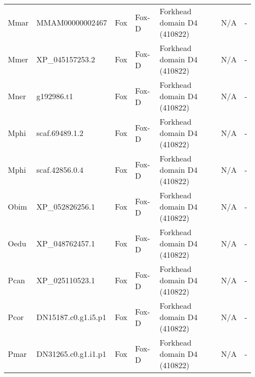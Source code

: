 \documentclass[../main.tex]{subfiles}
\begin{document}
\begin{landscape}
\begin{longtable}{lllllll}
		Mmar           & MMAM00000002467       & Fox            & Fox-D               & Forkhead domain D4 (410822)                 & N/A                                                                    & -                    \\
		Mmer           & XP\_045157253.2       & Fox            & Fox-D               & Forkhead domain D4 (410822)                 & N/A                                                                    & -                    \\
		Mner           & g192986.t1            & Fox            & Fox-D               & Forkhead domain D4 (410822)                 & N/A                                                                    & -                    \\
		Mphi           & scaf.69489.1.2        & Fox            & Fox-D               & Forkhead domain D4 (410822)                 & N/A                                                                    & -                    \\
		Mphi           & scaf.42856.0.4        & Fox            & Fox-D               & Forkhead domain D4 (410822)                 & N/A                                                                    & -                    \\
		Obim           & XP\_052826256.1       & Fox            & Fox-D               & Forkhead domain D4 (410822)                 & N/A                                                                    & -                    \\
		Oedu           & XP\_048762457.1       & Fox            & Fox-D               & Forkhead domain D4 (410822)                 & N/A                                                                    & -                    \\
		Pcan           & XP\_025110523.1       & Fox            & Fox-D               & Forkhead domain D4 (410822)                 & N/A                                                                    & -                    \\
		Pcor           & DN15187.c0.g1.i5.p1   & Fox            & Fox-D               & Forkhead domain D4 (410822)                 & N/A                                                                    & -                    \\
		Pmar           & DN31265.c0.g1.i1.p1   & Fox            & Fox-D               & Forkhead domain D4 (410822)                 & N/A                                                                    & -                    \\

\end{longtable}
\end{landscape}
\end{document}

